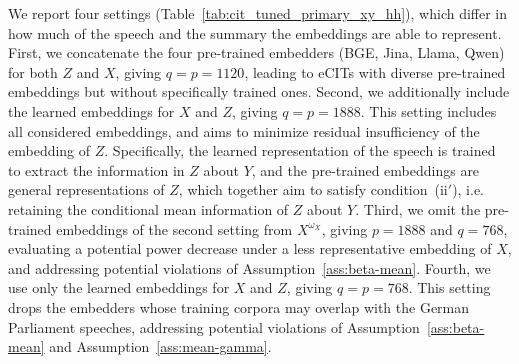 \documentclass[twoside,11pt]{article}
\begin{document}
We report four settings (Table~\ref{tab:cit_tuned_primary_xy_hh}), which differ in how much of the speech and the summary the embeddings are able to represent.
First, we concatenate the four pre-trained embedders (BGE, Jina, Llama, Qwen) for both $Z$ and $X$, giving $q=p = 1120$, leading to eCITs with diverse pre-trained embeddings but without specifically trained ones.
Second, we additionally include the  learned embeddings for $X$ and $Z$, %
giving $q=p = 1888$. This setting includes all considered embeddings, and aims to minimize residual insufficiency of the embedding of $Z$. Specifically, the learned representation of the speech is trained to extract the information in $Z$ about $Y$, and the pre-trained embeddings are general representations of $Z$, which together aim to satisfy condition~(ii$'$), i.e. retaining the conditional mean information of $Z$ about $Y$.
Third, we omit the pre-trained embeddings of the second setting from $X^{\omega_X}$, giving $p=1888$ and $ q = 768$, evaluating a potential power decrease under a less representative embedding of $X$, and addressing potential violations of Assumption~\ref{ass:beta-mean}.
Fourth, we use only the learned embeddings for $X$ and $Z$, giving $q = p = 768$. This setting drops the embedders whose training corpora may overlap with the German Parliament speeches, addressing potential violations of Assumption~\ref{ass:beta-mean} and Assumption~\ref{ass:mean-gamma}.
\end{document}
